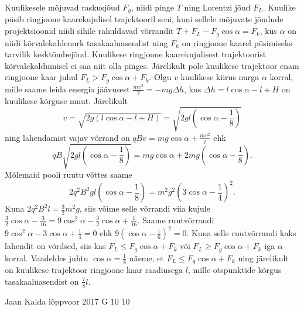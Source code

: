 \documentclass[11pt, twoside]{article}
\begin{document}
{{\ifSolution
Kuulikesele mõjuvad raskusjõud $F_g$, niidi pinge $T$ ning Lorentzi jõud $F_L$. Kuulike püsib ringjoone kaarekujulisel trajektooril seni, kuni sellele mõjuvate jõudude projektsioonid niidi sihile rahuldavad võrrandit $T+F_L-F_g\cos\alpha=F_k$, kus $\alpha$ on niidi kõrvalekaldenurk tasakaaluasendist ning $F_k$ on ringjoone kaarel püsimiseks tarvilik kesktõmbejõud. Kuulikese ringjoone kaarekujulisest trajektoorist kõrvalekaldumisel ei saa niit olla pinges. Järelikult pole kuulikese trajektoor enam ringjoone kaar juhul $F_L>F_g\cos\alpha+F_k$. Olgu $v$ kuulikese kiirus nurga $\alpha$ korral, mille saame leida energia jäävusest $\frac{mv^2}{2}=-mg\Delta h$, kus $\Delta h=l\cos\alpha-l+H$ on kuulikese kõrguse muut. Järelikult 
\[
v=\sqrt{2g\left(l\cos\alpha-l+H\right)}=\sqrt{2gl\left(\cos\alpha-\frac{1}{8}\right)}
\]
ning lahendamist vajav võrrand on $qBv=mg\cos\alpha+\frac{mv^2}{l}$ ehk 
\[
qB\sqrt{2gl\left(\cos\alpha-\frac{1}{8}\right)}=mg\cos\alpha+2mg\left(\cos\alpha-\frac{1}{8}\right).
\]
Mõlemaid pooli ruutu võttes saame
\[
2q^2B^2gl\left(\cos\alpha-\frac{1}{8}\right)=m^2g^2\left(3\cos\alpha-\frac{1}{4}\right)^2.
\] 
Kuna $2q^2B^2l=\frac{3}{2}m^2g$, siis võime selle võrrandi viia kujule $\frac{3}{2}\cos\alpha-\frac{3}{16}=9\cos^2\alpha-\frac{3}{2}\cos\alpha+\frac{1}{16}$. Saame ruutvõrrandi $9\cos^2\alpha-3\cos\alpha+\frac{1}{4}=0$ ehk $9\left(\cos\alpha-\frac{1}{6}\right)^2=0$. Kuna selle ruutvõrrandi kaks lahendit on võrdsed, siis kas $F_L\leq F_g\cos\alpha+F_k$ või $F_L\geq F_g\cos\alpha+F_k$ iga $\alpha$ korral. Vaadeldes juhtu $\cos\alpha=\frac{1}{8}$ näeme, et $F_L\leq F_g\cos\alpha+F_k$ ning järelikult on kuulikese trajektoor ringjoone kaar raadiusega $l$, mille otspunktide kõrgus tasakaaluasendist on $\frac{7}{8}l$.
\fi
}

{Jaan Kalda} %
{lõppvoor} %
{2017} %
{G 10} %
{10} %
{

}}
\end{document}
